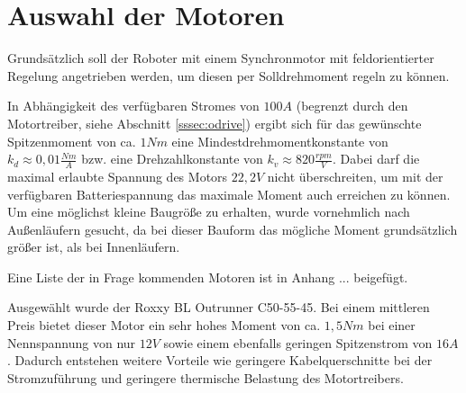 \renewcommand{\autoren}{Stephan Morongowski}
\newpage
\section{Auswahl der Motoren}

Grundsätzlich soll der Roboter mit einem Synchronmotor mit feldorientierter Regelung angetrieben werden, um diesen per Solldrehmoment regeln zu können.

In Abhängigkeit des verfügbaren Stromes von \(100 A\) (begrenzt durch den Motortreiber, siehe Abschnitt \ref{sssec:odrive}) ergibt sich für das gewünschte Spitzenmoment von ca. \(1 Nm\) eine Mindestdrehmomentkonstante von \(k_d \approx 0,01 \frac{Nm}{A}\) bzw. eine Drehzahlkonstante von \(k_v \approx  820 \frac{rpm}{V}\). Dabei darf die maximal erlaubte Spannung des Motors \(22,2 V\) nicht überschreiten, um mit der verfügbaren Batteriespannung das maximale Moment auch erreichen zu können. Um eine möglichst kleine Baugröße zu erhalten, wurde vornehmlich nach Außenläufern gesucht, da bei dieser Bauform das mögliche Moment grundsätzlich größer ist, als bei Innenläufern.

Eine Liste der in Frage kommenden Motoren ist in Anhang ... beigefügt.

Ausgewählt wurde der \glqq Roxxy BL Outrunner C50-55-45\grqq{}. Bei einem mittleren Preis bietet dieser Motor ein sehr hohes Moment von ca. \(1,5 Nm\) bei einer Nennspannung von nur \(12 V\) sowie einem ebenfalls geringen Spitzenstrom von \(16 A\). Dadurch entstehen weitere Vorteile wie geringere Kabelquerschnitte bei der Stromzuführung und geringere thermische Belastung des Motortreibers.
\newpage
